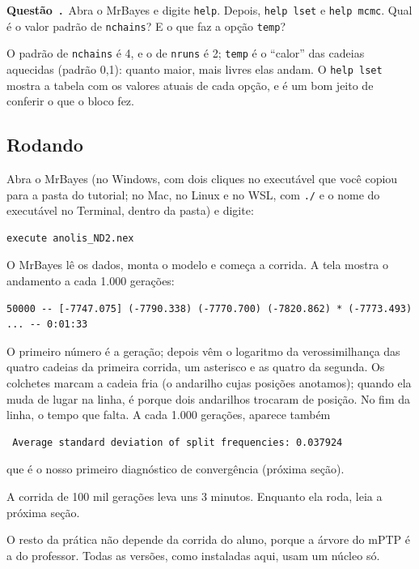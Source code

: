 \documentclass[11pt,a4paper]{article}
\newcommand{\cmd}[1]{\texttt{#1}}
\newcounter{questao}
\newcommand{\questao}{\par\needspace{3\baselineskip}\refstepcounter{questao}\noindent\textbf{Questão~\thequestao.}\ }
\begin{document}
\questao Abra o MrBayes e digite \cmd{help}. Depois, \cmd{help lset} e \cmd{help mcmc}. Qual é o
valor padrão de \cmd{nchains}? E o que faz a opção \cmd{temp}?

\begin{resposta}
O padrão de \cmd{nchains} é 4, e o de \cmd{nruns} é 2; \cmd{temp} é o ``calor'' das cadeias
aquecidas (padrão 0,1): quanto maior, mais livres elas andam. O \cmd{help lset} mostra a tabela
com os valores atuais de cada opção, e é um bom jeito de conferir o que o bloco fez.
\end{resposta}

\subsection{Rodando}

Abra o MrBayes (no Windows, com dois cliques no executável que você copiou para a pasta do
tutorial; no Mac, no Linux e no WSL, com \cmd{./} e o nome do executável no Terminal, dentro da
pasta) e digite:
\begin{Verbatim}
execute anolis_ND2.nex
\end{Verbatim}
O MrBayes lê os dados, monta o modelo e começa a corrida. A tela mostra o andamento a cada
1.000 gerações:
\begin{Verbatim}[fontsize=\footnotesize]
 50000 -- [-7747.075] (-7790.338) (-7770.700) (-7820.862) * (-7773.493) ... -- 0:01:33
\end{Verbatim}
O primeiro número é a geração; depois vêm o logaritmo da verossimilhança das quatro cadeias da
primeira corrida, um asterisco e as quatro da segunda. Os colchetes marcam a cadeia fria (o andarilho
cujas posições anotamos); quando ela muda de lugar na linha, é porque dois andarilhos trocaram
de posição. No fim da linha, o tempo que falta. A cada 1.000 gerações, aparece também
\begin{Verbatim}
 Average standard deviation of split frequencies: 0.037924
\end{Verbatim}
que é o nosso primeiro diagnóstico de convergência (próxima seção).

A corrida de 100 mil gerações leva uns 3 minutos. Enquanto ela roda, leia a próxima seção.

\begin{resposta}
O resto da prática não depende da corrida do aluno, porque a árvore do mPTP é a do professor.
Todas as versões, como instaladas aqui, usam um núcleo só.
\end{resposta}
\end{document}
